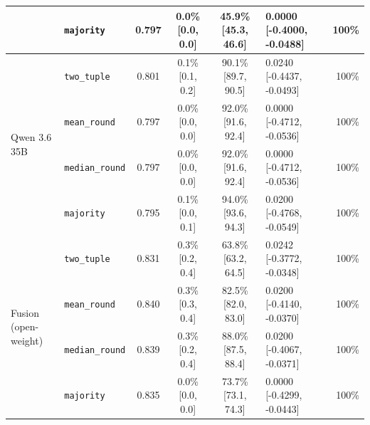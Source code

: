 \begin{table}[htbp]
\begin{tabular}{llccclr}
   & \texttt{majority} & 0.797 & 0.0\% \tiny[0.0, 0.0] & 45.9\% \tiny[45.3, 46.6] & 0.0000 [-0.4000, -0.0488] & 100\% \\
\midrule
  \multirow{4}{*}{Qwen 3.6 35B} & \texttt{two\_tuple} & 0.801 & 0.1\% \tiny[0.1, 0.2] & 90.1\% \tiny[89.7, 90.5] & 0.0240 [-0.4437, -0.0493] & 100\% \\
   & \texttt{mean\_round} & 0.797 & 0.0\% \tiny[0.0, 0.0] & 92.0\% \tiny[91.6, 92.4] & 0.0000 [-0.4712, -0.0536] & 100\% \\
   & \texttt{median\_round} & 0.797 & 0.0\% \tiny[0.0, 0.0] & 92.0\% \tiny[91.6, 92.4] & 0.0000 [-0.4712, -0.0536] & 100\% \\
   & \texttt{majority} & 0.795 & 0.1\% \tiny[0.0, 0.1] & 94.0\% \tiny[93.6, 94.3] & 0.0200 [-0.4768, -0.0549] & 100\% \\
\midrule
  \multirow{4}{*}{Fusion (open-weight)} & \texttt{two\_tuple} & 0.831 & 0.3\% \tiny[0.2, 0.4] & 63.8\% \tiny[63.2, 64.5] & 0.0242 [-0.3772, -0.0348] & 100\% \\
   & \texttt{mean\_round} & 0.840 & 0.3\% \tiny[0.3, 0.4] & 82.5\% \tiny[82.0, 83.0] & 0.0200 [-0.4140, -0.0370] & 100\% \\
   & \texttt{median\_round} & 0.839 & 0.3\% \tiny[0.2, 0.4] & 88.0\% \tiny[87.5, 88.4] & 0.0200 [-0.4067, -0.0371] & 100\% \\
   & \texttt{majority} & 0.835 & 0.0\% \tiny[0.0, 0.0] & 73.7\% \tiny[73.1, 74.3] & 0.0000 [-0.4299, -0.0443] & 100\% \\
\bottomrule
\end{tabular}
\end{table}
